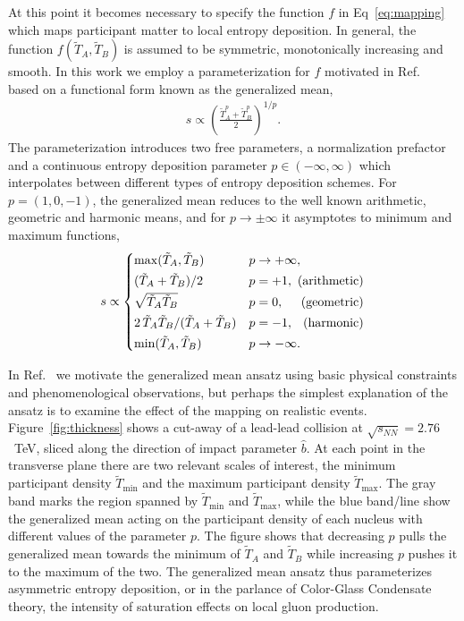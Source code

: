 \documentclass[aps,prc,reprint,amsmath,nofootinbib,superscriptaddress]{revtex4-1}
\newcommand{\sqrts}{\sqrt{s_{NN}}}
\newcommand{\T}{\tilde{T}}
\begin{document}
At this point it becomes necessary to specify the function $f$ in Eq~\eqref{eq:mapping} which maps participant matter to local entropy deposition.
In general, the function $f(\T_A, \T_B)$ is assumed to be symmetric, monotonically increasing and smooth.
In this work we employ a parameterization for $f$ motivated in Ref.~\cite{Moreland:2014oya} based on a functional form known as the generalized mean,
\begin{align}
  s \propto \left( \frac{\T_A^p + \T_B^p}{2} \right)^{1/p}.
  \label{eq:genmean}
\end{align}
The parameterization introduces two free parameters, a normalization prefactor and a continuous entropy deposition parameter $p\in(-\infty, \infty)$ which interpolates between different types of entropy deposition schemes.
For ${p=(1, 0, -1)}$, the generalized mean reduces to the well known arithmetic, geometric and harmonic means, and for $p\rightarrow \pm\infty$ it asymptotes to minimum and maximum functions,
\begin{equation}
  \newlength{\extraspace}
  \setlength{\extraspace}{0.5ex}
  s \propto
  \begin{cases}
    \max(\T_A, \T_B) & p \rightarrow +\infty, \\[\extraspace]
    (\T_A + \T_B)/2 & p = +1, \hfill \text{ (arithmetic)} \\[\extraspace]
    \sqrt{\T_A \T_B} & p = 0, \hfill \text{ (geometric)} \\[\extraspace]
    2\, \T_A \T_B/(\T_A + \T_B) & p = -1, \hfill \text{ (harmonic)} \\[\extraspace]
    \min(\T_A, \T_B) & p \rightarrow -\infty.
  \end{cases}
  \label{eq:means}
\end{equation}

In Ref.~\cite{Moreland:2014oya} we motivate the generalized mean ansatz using basic physical constraints and phenomenological observations, but perhaps the simplest explanation of the ansatz is to examine the effect of the mapping on realistic events.
Figure~\ref{fig:thickness} shows a cut-away of a lead-lead collision at $\sqrts=2.76$~TeV, sliced along the direction of impact parameter $\hat{b}$.
At each point in the transverse plane there are two relevant scales of interest, the minimum participant density $\T_\text{min}$ and the maximum participant density $\T_\text{max}$.
The gray band marks the region spanned by $\T_\text{min}$ and $\T_\text{max}$, while the blue band/line show the generalized mean acting on the participant density of each nucleus with different values of the parameter $p$.
The figure shows that decreasing $p$ pulls the generalized mean towards the minimum of $\T_A$ and $\T_B$ while increasing $p$ pushes it to the maximum of the two.
The generalized mean ansatz thus parameterizes asymmetric entropy deposition, or in the parlance of Color-Glass Condensate theory, the intensity of saturation effects on local gluon production.
\end{document}
